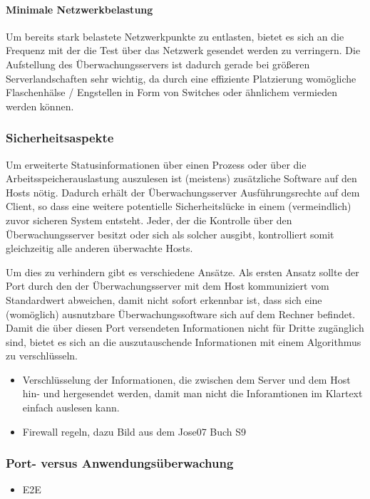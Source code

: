 \paragraph{Minimale Netzwerkbelastung}
Um bereits stark belastete Netzwerkpunkte zu entlasten, bietet es sich an die Frequenz mit der die Test über das Netzwerk gesendet werden zu verringern.
Die Aufstellung des Überwachungsservers ist dadurch gerade bei größeren Serverlandschaften sehr wichtig, da durch eine effiziente Platzierung womögliche Flaschenhälse / Engstellen in Form von Switches oder ähnlichem vermieden werden können.

\subsubsection{Sicherheitsaspekte}
Um erweiterte Statusinformationen über einen Prozess oder über die Arbeitsspeicherauslastung auszulesen ist (meistens) zusätzliche Software auf den Hosts nötig.
Dadurch erhält der Überwachungsserver Ausführungsrechte auf dem Client, so dass eine weitere potentielle Sicherheitslücke in einem (vermeindlich) zuvor sicheren System entsteht.
Jeder, der die Kontrolle über den Überwachungsserver besitzt oder sich als solcher ausgibt, kontrolliert somit gleichzeitig alle anderen überwachte Hosts.

Um dies zu verhindern gibt es verschiedene Ansätze.
Als ersten Ansatz sollte der Port durch den der Überwachungsserver mit dem Host kommuniziert vom Standardwert abweichen, damit nicht sofort erkennbar ist, dass sich eine (womöglich) ausnutzbare Überwachungssoftware sich auf dem Rechner befindet.
Damit die über diesen Port versendeten Informationen nicht für Dritte zugänglich sind, bietet es sich an die auszutauschende Informationen mit einem Algorithmus zu verschlüsseln.

\begin{itemize}
\item Verschlüsselung der Informationen, die zwischen dem Server und dem Host hin- und hergesendet werden, damit man nicht die Inforamtionen im Klartext einfach auslesen kann.
\item Firewall regeln, dazu Bild aus dem Jose07 Buch S9
\end{itemize}
\subsubsection{Port- versus Anwendungsüberwachung}
\begin{itemize}
\item E2E
\end{itemize}




























